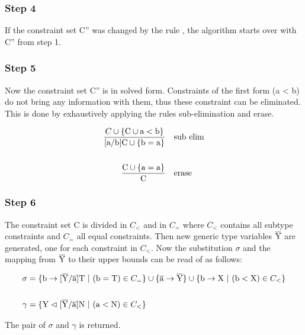 \subsubsection{Step 4}
If the constraint set C'' was changed by the rule , the algorithm starts over with C'' from step 1.

\subsubsection{Step 5}
Now the constraint set C'' is in solved form. Constraints of the first form (a < b) do not bring any information with them, thus these constraint can be eliminated.
This is done by exhaustively applying the rules sub-elimination and erase.

\begin{align*}
    \frac{C \cup \{ \text{C} \cup \text{a} < \text{b} \}}{ \text{[a/b]C} \cup \{ \text{b} = \text{a} \} } \quad &\text{sub elim}
    \\
    \\
    \frac{\text{C} \cup \{ \text{a} = \text{a} \} }{ \text{C} } \quad &\text{erase}
\end{align*}

\subsubsection{Step 6}
The constraint set C is divided in $C_<$ and in $C_=$ where $C_<$ contains all subtype constraints and $C_=$ all equal constraints.
Then new generic type variables $\overline{\text{Y}}$ are generated, one for each constraint in $C_<$. Now the substitution $\sigma$ and the mapping from $\overline{\text{Y}}$ to their upper bounds can be read of as follows:

\begin{align*}
    \sigma &= \{ \text{b} \to \tsxsn{Y}{a}{T} \ | \ (\text{b} = \text{T}) \in C_= \} \cup \{ \ot{a} \to \ot{Y} \} \cup \{ \text{b} \to \text{X} \ | \ (\text{b} < \text{X}) \in C_< \}\\
    \\
    \gamma &= \{ \text{Y} \vartriangleleft \tsxsn{Y}{a}{N} \ | \ (\text{a} < \text{N}) \in C_< \}\\
\end{align*}

The pair of $\sigma$ and $\gamma$ is returned.
